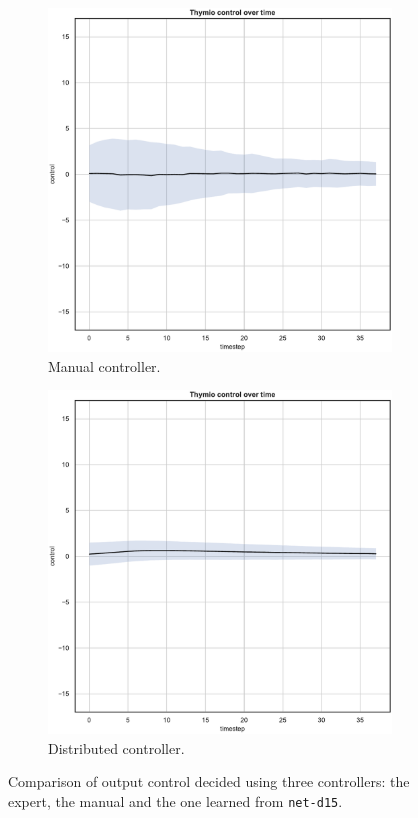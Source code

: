 \begin{figure}[!htb]
\begin{subfigure}[h]{0.3\textwidth}
		\includegraphics[width=\textwidth]{contents/images/net-d15/control-overtime-manual}%
		\caption{Manual controller.}
	\end{subfigure}
	\hfill
	\begin{subfigure}[h]{0.3\textwidth}
		\centering
		\includegraphics[width=\textwidth]{contents/images/net-d15/control-overtime-learned_distributed}
		\caption{Distributed controller.}
	\end{subfigure}
	\caption[Evaluation of the control decided by \texttt{net-d15}.]{Comparison 
		of output control decided using three controllers: the expert, the manual 
		and the one learned from \texttt{net-d15}.}
	\label{fig:net-d15control}
\end{figure}

